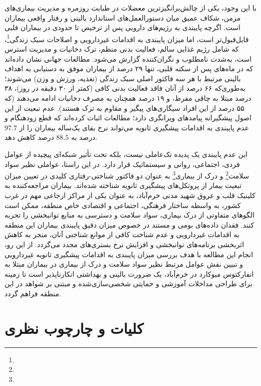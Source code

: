 با این وجود، یکی از چالش‌برانگیزترین معضلات در طبابت روزمره و مدیریت بیماری‌های مزمن، شکاف عمیق میان دستورالعمل‌های استاندارد بالینی و رفتار واقعی بیماران است. اگرچه پایبندی به رژیم‌های دارویی پس از ترخیص تا حدودی در بیماران قلبی قابل‌قبول‌تر است، اما میزان پایبندی به اقدامات غیردارویی و اصلاحات سبک زندگی\footnote{}، که شامل رژیم غذایی سالم، فعالیت بدنی منظم، ترک دخانیات و مدیریت استرس است، به‌شدت نامطلوب و نگران‌کننده گزارش می‌شود\cite{Keenan2017Adherence,Kotseva2019EUROASPIRE}. مطالعات جهانی نشان داده‌اند که در ماه‌های پس از سکته قلبی، تنها ۲۹ درصد از بیماران موفق به دستیابی به اهداف بالینی مرتبط با هر سه فاکتور اصلی سبک زندگی (تغذیه، ورزش و وزن) می‌شوند؛ به‌طوری‌که ۶۶ درصد از آنان فاقد فعالیت بدنی کافی (کمتر از ۳۰ دقیقه در روز)، ۳۸ درصد مبتلا به چاقی مفرط، و ۱۹ درصد همچنان به مصرف دخانیات ادامه می‌دهند (که ۵۵ درصد از این افراد سیگاری‌های پیگیر و مقاوم به ترک هستند)\cite{Kotseva2019EUROASPIRE}. عدم تبعیت از این اصول پیشگیرانه پیامدهای ویرانگری دارد؛ مطالعات اثبات کرده‌اند که قطع زودهنگام و عدم پایبندی به اقدامات پیشگیری ثانویه می‌تواند نرخ بقای یک‌ساله بیماران را از $97.7$ درصد به $88.5$ درصد کاهش دهد\cite{Hammer2024Adherence}.

این عدم پایبندی یک پدیده تک‌عاملی نیست، بلکه تحت تأثیر شبکه‌ای پیچیده از عوامل فردی، اجتماعی، روانی و سیستماتیک قرار دارد\cite{Mohandas2025RecurrentMI}. در این راستا، عواملی نظیر سواد سلامت\footnote{} و درک از بیماری\footnote{} به عنوان دو فاکتور شناختی-رفتاری کلیدی در تعیین میزان تبعیت بیمار از پروتکل‌های پیشگیری ثانویه شناخته شده‌اند\cite{Foxwell2013IllnessPerceptions}. بیماران مراجعه‌کننده به کلینیک قلب و عروق شهید مدنی خرم‌آباد، به عنوان یکی از مراکز ارجاعی مهم در غرب کشور، به واسطه ساختار فرهنگی، اجتماعی و اقتصادی خاص منطقه، ممکن است الگوهای متفاوتی از درک بیماری، سواد سلامت و دسترسی به منابع توانبخشی را تجربه کنند. فقدان داده‌های بومی و مستند در خصوص میزان دقیق پایبندی بیماران این منطقه به اقدامات غیردارویی و عدم شناخت کافی از موانع شناختی آنان، منجر به کاهش اثربخشی برنامه‌های توانبخشی و افزایش نرخ بستری‌های مجدد می‌گردد. از این رو، انجام این مطالعه با هدف بررسی میزان پایبندی به اقدامات پیشگیری ثانویه غیردارویی و تبیین نقش عوامل مرتبط نظیر سواد سلامت و درک از بیماری در بیماران مبتلا به انفارکتوس میوکارد در خرم‌آباد، یک ضرورت بالینی و بهداشتی انکارناپذیر است تا زمینه برای طراحی مداخلات آموزشی و حمایتی شخصی‌سازی‌شده و مبتنی بر شواهد در این منطقه فراهم گردد.

\section{کلیات و چارچوب نظری}
